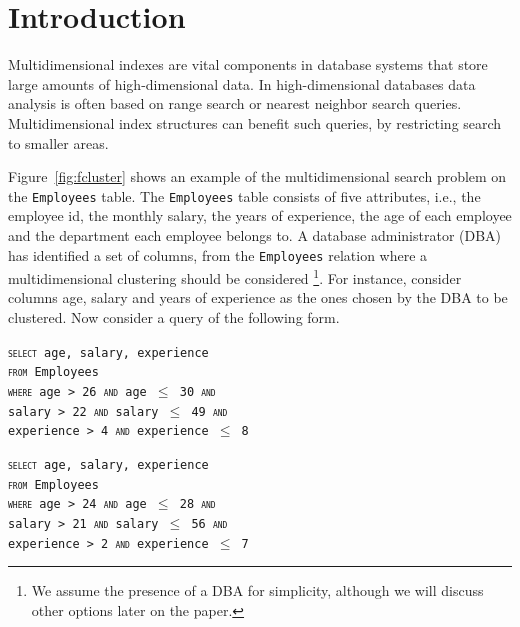 \section{Introduction}
\label{sec:introduction}

Multidimensional indexes are vital components in database systems that store
large amounts of high-dimensional data. In high-dimensional databases data 
analysis is often based on range search or nearest neighbor search queries. 
Multidimensional index structures can benefit such queries, by restricting
search to smaller areas.

Figure~\ref{fig:fcluster} shows an example of the multidimensional search
problem on the \texttt{Employees} table. The \texttt{Employees} table consists
of five attributes, i.e., the employee id, the monthly salary, the years
of experience, the age of each employee and the department each employee 
belongs to.
A database administrator (DBA) has identified a set of columns,
from the \texttt{Employees} relation where a
multidimensional clustering should be considered
\footnote{We assume the presence of a DBA for simplicity, although we 
will discuss other options later on the paper.}. For instance, consider
 columns age, salary and years of experience as the ones chosen by the DBA
to be clustered. Now consider a query of the following form.

\begin{flushleft}
\texttt{\textsc{select} age, salary, experience\\
\textsc{from} Employees\\
\textsc{where} age > 26 \textsc{and} age $\leq$ 30 \textsc{and}\\
salary > 22 \textsc{and}  salary $\leq$ 49 \textsc{and}\\
experience > 4 \textsc{and} experience $\leq$ 8}
\end{flushleft}

\begin{flushleft}
\texttt{\textsc{select} age, salary, experience\\
\textsc{from} Employees\\
\textsc{where} age > 24 \textsc{and} age $\leq$ 28 \textsc{and}\\
salary > 21 \textsc{and}  salary $\leq$ 56 \textsc{and}\\
experience > 2 \textsc{and} experience $\leq$ 7}
\end{flushleft}

